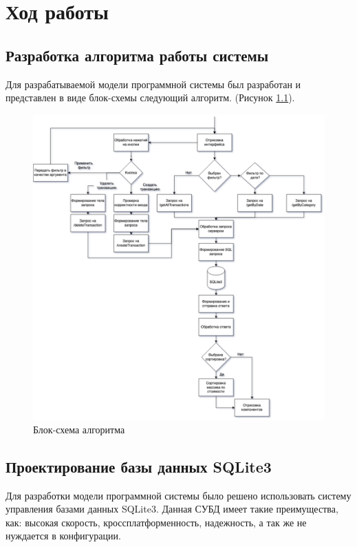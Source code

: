 \documentclass[14pt]{extreport}
\begin{document}
\chapter{Ход работы}
\section{Разработка алгоритма работы системы}
Для разрабатываемой модели программной системы был разработан и представлен в виде блок-схемы следующий алгоритм. (Рисунок \ref{fig:d0}).
\begin{figure}[h]   
    \centering
    \includegraphics[width=1\linewidth]{block.png}
    \caption{ Блок-схема алгоритма }
    \label{fig:d0}
\end{figure}
\section{Проектирование базы данных SQLite3}

Для разработки модели программной системы было решено использовать систему управления базами данных SQLite3. Данная СУБД имеет такие преимущества, как: высокая скорость, кроссплатформенность, надежность, а так же не нуждается в конфигурации. 
\end{document}
